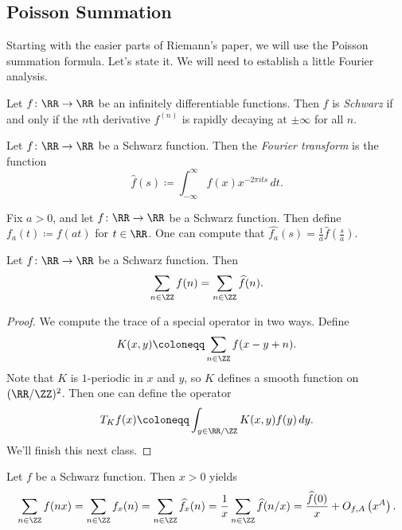 \documentclass[../notes.tex]{subfiles}
\begin{document}
\subsection{Poisson Summation}
Starting with the easier parts of Riemann's paper, we will use the Poisson summation formula. Let's state it. We will need to establish a little Fourier analysis.
\begin{definition}[Schwarz]
	Let $f\colon\RR\to\RR$ be an infinitely differentiable functions. Then $f$ is \textit{Schwarz} if and only if the $n$th derivative $f^{(n)}$ is rapidly decaying at $\pm\infty$ for all $n$.
\end{definition}
\begin{definition}
	Let $f\colon\RR\to\RR$ be a Schwarz function. Then the \textit{Fourier transform} is the function
	\[\widehat f(s)\coloneqq\int_{-\infty}^\infty f(x)x^{-2\pi its}\,dt.\]
\end{definition}
\begin{example}
	Fix $a>0$, and let $f\colon\RR\to\RR$ be a Schwarz function. Then define $f_a(t)\coloneqq f(at)$ for $t\in\RR$. One can compute that $\widehat{f_a}(s)=\frac1a\widehat f\left(\frac sa\right)$.
\end{example}
\begin{theorem}
	Let $f\colon\RR\to\RR$ be a Schwarz function. Then
	\[\sum_{n\in\ZZ}f(n)=\sum_{n\in\ZZ}\widehat f(n).\]
\end{theorem}
\begin{proof}
	We compute the trace of a special operator in two ways. Define
	\[K(x,y)\coloneqq\sum_{n\in\ZZ}f(x-y+n).\]
	Note that $K$ is $1$-periodic in $x$ and $y$, so $K$ defines a smooth function on $(\RR/\ZZ)^2$. Then one can define the operator
	\[T_Kf(x)\coloneqq\int_{y\in\RR/\ZZ}K(x,y)f(y)\,dy.\]
	We'll finish this next class.
\end{proof}
\begin{example}
	Let $f$ be a Schwarz function. Then $x>0$ yields
	\[\sum_{n\in\ZZ}f(nx)=\sum_{n\in\ZZ}f_x(n)=\sum_{n\in\ZZ}\widehat{f_x}(n)=\frac1x\sum_{n\in\ZZ}\widehat f(n/x)=\frac{\widehat f(0)}x+O_{f,A}\left(x^A\right).\]
\end{example}
\end{document}
